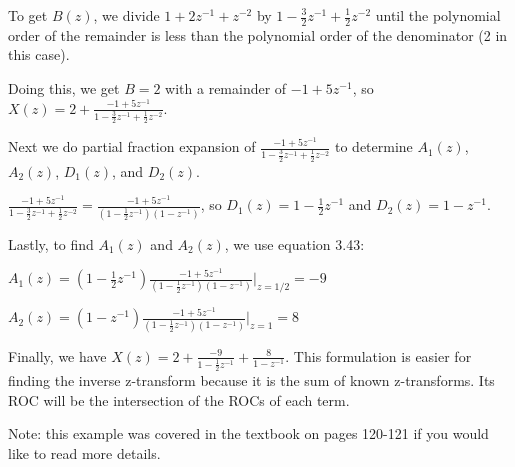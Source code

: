 \documentclass[11pt]{article}
\begin{document}
{\color{blue}
To get $B(z)$, we divide $1+2z^{-1}+z^{-2}$ by $1-\frac{3}{2}z^{-1}+\frac{1}{2}z^{-2}$ until the polynomial order of the remainder is less than the polynomial order of the denominator (2 in this case). 

Doing this, we get $B=2$ with a remainder of $-1+5z^{-1}$, so $X(z) = 2+ \frac{-1+5z^{-1}}{1-\frac{3}{2}z^{-1}+\frac{1}{2}z^{-2}}$. 

Next we do partial fraction expansion of $\frac{-1+5z^{-1}}{1-\frac{3}{2}z^{-1}+\frac{1}{2}z^{-2}}$ to determine $A_1(z)$, $A_2(z)$, $D_1(z)$, and $D_2(z)$.

$\frac{-1+5z^{-1}}{1-\frac{3}{2}z^{-1}+\frac{1}{2}z^{-2}} = \frac{-1+5z^{-1}}{(1-\frac{1}{2}z^{-1})(1-z^{-1})}$, so $D_1(z) = 1-\frac{1}{2}z^{-1}$ and $D_2(z)=1-z^{-1}$.

Lastly, to find $A_1(z)$ and $A_2(z)$, we use equation 3.43:

$A_1(z)=(1-\frac{1}{2}z^{-1})\frac{-1+5z^{-1}}{(1-\frac{1}{2}z^{-1})(1-z^{-1})}\bigg|_{z=1/2} = -9$


$A_2(z)=(1-z^{-1})\frac{-1+5z^{-1}}{(1-\frac{1}{2}z^{-1})(1-z^{-1})}\bigg|_{z=1} = 8$

Finally, we have $X(z) = 2+ \frac{-9}{1-\frac{1}{2}z^{-1}}+\frac{8}{1-z^{-1}}$. This formulation is easier for finding the inverse z-transform because it is the sum of known z-transforms. Its ROC will be the intersection of the ROCs of each term.

Note: this example was covered in the textbook on pages 120-121 if you would like to read more details.
}
\end{document}
